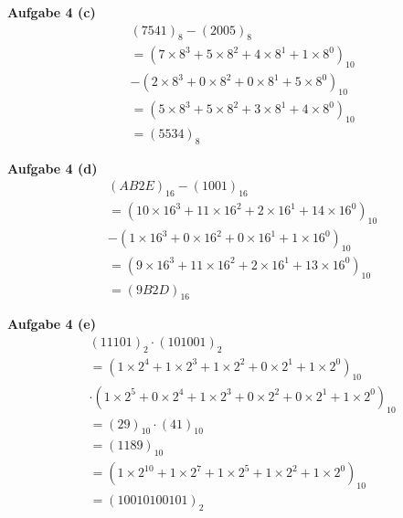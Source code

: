 \documentclass[12pt]{extarticle}
\begin{document}
\textbf{Aufgabe 4 (c)}
\begin{align*}
  &(7541)_8-(2005)_8\\
  &=(7 \times 8^3 + 5 \times 8^2 + 4 \times 8^1 + 1 \times 8^0)_{10}\\
  &-(2 \times 8^3 + 0 \times 8^2 + 0 \times 8^1 + 5 \times 8^0)_{10}\\
  &=(5 \times 8^3 + 5 \times 8^2 + 3 \times 8^1 + 4 \times 8^0)_{10}\\
  &=(5534)_8
\end{align*}


\textbf{Aufgabe 4 (d)}
\begin{align*}
  &(AB2E)_{16}-(1001)_{16}\\
  &=(10 \times 16^3 + 11 \times 16^2 + 2 \times 16^1 + 14 \times 16^0)_{10}\\
  &-(1 \times 16^3 + 0 \times 16^2 + 0 \times 16^1 + 1 \times 16^0)_{10}\\
  &=(9 \times 16^3 + 11 \times 16^2 + 2 \times 16^1 + 13 \times 16^0)_{10}\\
  &=(9B2D)_{16}
\end{align*}

\textbf{Aufgabe 4 (e)}
\begin{align*}
  &(11101)_{2}\cdot (101001)_{2}\\
  &=(1 \times 2^4 + 1 \times 2^3 + 1 \times 2^2 + 0 \times 2^1 + 1 \times 2^0)_{10}\\
  &\cdot(1 \times 2^5+ 0 \times 2^4+ 1 \times 2^3 + 0 \times 2^2 + 0 \times 2^1 + 1 \times 2^0)_{10}\\
  &=(29)_{10} \cdot (41)_{10}\\
  &=(1189)_{10}\\
  &=(1 \times 2^{10} + 1 \times 2^7 + 1 \times 2^5 + 1 \times 2^2 + 1
    \times 2^0)_{10}\\
  &=(10010100101)_2
\end{align*}
\end{document}

